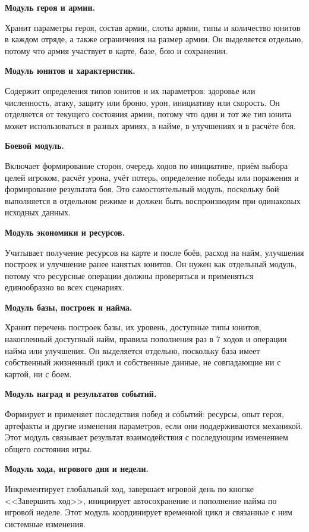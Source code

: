 \documentclass[12pt,a4paper]{article}
\begin{document}
\textbf{Модуль героя и армии.}

Хранит параметры героя, состав армии, слоты армии, типы и количество юнитов в каждом отряде, а также ограничения на размер армии. Он выделяется отдельно, потому что армия участвует в карте, базе, бою и сохранении.

\textbf{Модуль юнитов и характеристик.}

Содержит определения типов юнитов и их параметров: здоровье или численность, атаку, защиту или броню, урон, инициативу или скорость. Он отделяется от текущего состояния армии, потому что один и тот же тип юнита может использоваться в разных армиях, в найме, в улучшениях и в расчёте боя.

\textbf{Боевой модуль.}

Включает формирование сторон, очередь ходов по инициативе, приём выбора целей игроком, расчёт урона, учёт потерь, определение победы или поражения и формирование результата боя. Это самостоятельный модуль, поскольку бой выполняется в отдельном режиме и должен быть воспроизводим при одинаковых исходных данных.

\textbf{Модуль экономики и ресурсов.}

Учитывает получение ресурсов на карте и после боёв, расход на найм, улучшения построек и улучшение ранее нанятых юнитов. Он нужен как отдельный модуль, потому что ресурсные операции должны проверяться и применяться единообразно во всех сценариях.

\textbf{Модуль базы, построек и найма.}

Хранит перечень построек базы, их уровень, доступные типы юнитов, накопленный доступный найм, правила пополнения раз в 7 ходов и операции найма или улучшения. Он выделяется отдельно, поскольку база имеет собственный жизненный цикл и собственные данные, не совпадающие ни с картой, ни с боем.

\textbf{Модуль наград и результатов событий.}

Формирует и применяет последствия побед и событий: ресурсы, опыт героя, артефакты и другие изменения параметров, если они поддерживаются механикой. Этот модуль связывает результат взаимодействия с последующим изменением общего состояния игры.

\textbf{Модуль хода, игрового дня и недели.}

Инкрементирует глобальный ход, завершает игровой день по кнопке <<Завершить ход>>, инициирует автосохранение и пополнение найма по игровой неделе. Этот модуль координирует временной цикл и связанные с ним системные изменения.
\end{document}
